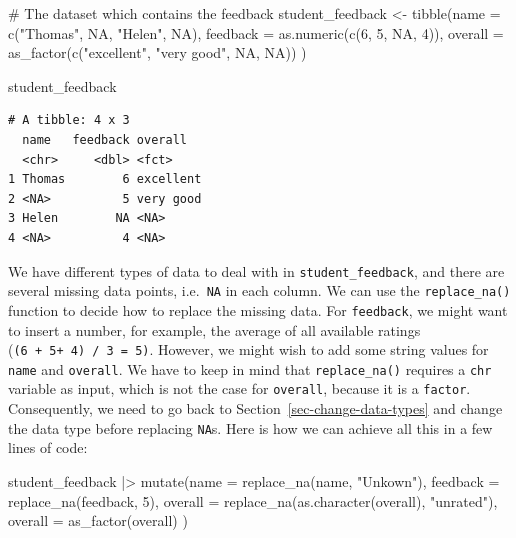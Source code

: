 \documentclass[
  letterpaper,
]{krantz}
\makeatletter
\newenvironment{Shaded}{\begin{snugshade}}{\end{snugshade}}
\newcommand{\AttributeTok}[1]{\textcolor[rgb]{0.40,0.45,0.13}{#1}}
\newcommand{\CommentTok}[1]{\textcolor[rgb]{0.37,0.37,0.37}{#1}}
\newcommand{\ConstantTok}[1]{\textcolor[rgb]{0.56,0.35,0.01}{#1}}
\newcommand{\DecValTok}[1]{\textcolor[rgb]{0.68,0.00,0.00}{#1}}
\newcommand{\FunctionTok}[1]{\textcolor[rgb]{0.28,0.35,0.67}{#1}}
\newcommand{\NormalTok}[1]{\textcolor[rgb]{0.00,0.23,0.31}{#1}}
\newcommand{\OtherTok}[1]{\textcolor[rgb]{0.00,0.23,0.31}{#1}}
\newcommand{\SpecialCharTok}[1]{\textcolor[rgb]{0.37,0.37,0.37}{#1}}
\newcommand{\StringTok}[1]{\textcolor[rgb]{0.13,0.47,0.30}{#1}}
\newenvironment{kframe}{%
\medskip{}
\setlength{\fboxsep}{.8em}
 \def\at@end@of@kframe{}%
 \ifinner\ifhmode%
  \def\at@end@of@kframe{\end{minipage}}%
  \begin{minipage}{\columnwidth}%
 \fi\fi%
 \def\FrameCommand##1{\hskip\@totalleftmargin \hskip-\fboxsep
 \colorbox{shadecolor}{##1}\hskip-\fboxsep
     \hskip-\linewidth \hskip-\@totalleftmargin \hskip\columnwidth}%
 \MakeFramed {\advance\hsize-\width
   \@totalleftmargin\z@ \linewidth\hsize
   \@setminipage}}%
 {\par\unskip\endMakeFramed%
 \at@end@of@kframe}
\renewenvironment{Shaded}{\begin{kframe}}{\end{kframe}}
\makeatother
\begin{document}
\begin{Shaded}
\begin{Highlighting}[]
\CommentTok{\# The dataset which contains the feedback}
\NormalTok{student\_feedback }\OtherTok{\textless{}{-}} \FunctionTok{tibble}\NormalTok{(}\AttributeTok{name =} \FunctionTok{c}\NormalTok{(}\StringTok{"Thomas"}\NormalTok{, }\ConstantTok{NA}\NormalTok{, }\StringTok{"Helen"}\NormalTok{, }\ConstantTok{NA}\NormalTok{),}
                           \AttributeTok{feedback =} \FunctionTok{as.numeric}\NormalTok{(}\FunctionTok{c}\NormalTok{(}\DecValTok{6}\NormalTok{, }\DecValTok{5}\NormalTok{, }\ConstantTok{NA}\NormalTok{, }\DecValTok{4}\NormalTok{)),}
                           \AttributeTok{overall =} \FunctionTok{as\_factor}\NormalTok{(}\FunctionTok{c}\NormalTok{(}\StringTok{"excellent"}\NormalTok{,}
                                                 \StringTok{"very good"}\NormalTok{,}
                                                 \ConstantTok{NA}\NormalTok{, }\ConstantTok{NA}\NormalTok{))}
\NormalTok{                           )}

\NormalTok{student\_feedback}
\end{Highlighting}
\end{Shaded}

\begin{verbatim}
# A tibble: 4 x 3
  name   feedback overall  
  <chr>     <dbl> <fct>    
1 Thomas        6 excellent
2 <NA>          5 very good
3 Helen        NA <NA>     
4 <NA>          4 <NA>     
\end{verbatim}

We have different types of data to deal with in
\texttt{student\_feedback}, and there are several missing data points,
i.e.~\texttt{NA} in each column. We can use the \texttt{replace\_na()}
function to decide how to replace the missing data. For
\texttt{feedback}, we might want to insert a number, for example, the
average of all available ratings (\texttt{(6\ +\ 5+\ 4)\ /\ 3\ =\ 5)}.
However, we might wish to add some string values for \texttt{name} and
\texttt{overall}. We have to keep in mind that \texttt{replace\_na()}
requires a \texttt{chr} variable as input, which is not the case for
\texttt{overall}, because it is a \texttt{factor}. Consequently, we need
to go back to Section~\ref{sec-change-data-types} and change the data
type before replacing \texttt{NA}s. Here is how we can achieve all this
in a few lines of code:

\begin{Shaded}
\begin{Highlighting}[]
\NormalTok{student\_feedback }\SpecialCharTok{|\textgreater{}}
  \FunctionTok{mutate}\NormalTok{(}\AttributeTok{name =} \FunctionTok{replace\_na}\NormalTok{(name, }\StringTok{"Unkown"}\NormalTok{),}
         \AttributeTok{feedback =} \FunctionTok{replace\_na}\NormalTok{(feedback, }\DecValTok{5}\NormalTok{),}
         \AttributeTok{overall =} \FunctionTok{replace\_na}\NormalTok{(}\FunctionTok{as.character}\NormalTok{(overall),}
                              \StringTok{"unrated"}\NormalTok{),}
         \AttributeTok{overall =} \FunctionTok{as\_factor}\NormalTok{(overall)}
\NormalTok{         )}
\end{Highlighting}
\end{Shaded}
\end{document}
